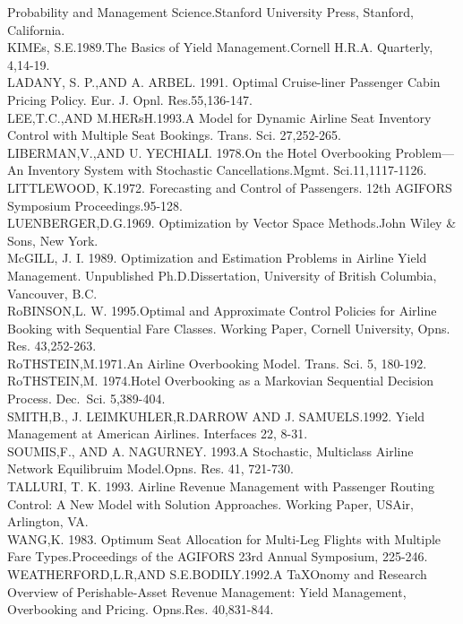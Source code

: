 Probability and Management Science.Stanford University Press, Stanford,
California.\\
KIMEs, S.E.1989.The Basics of Yield Management.Cornell H.R.A. Quarterly,
4,14-19.\\
LADANY, S. P.,AND A. ARBEL. 1991. Optimal Cruise-liner Passenger Cabin
Pricing Policy. Eur. J. Opnl. Res.55,136-147.\\
LEE,T.C.,AND M.HERsH.1993.A Model for Dynamic Airline Seat Inventory
Control with Multiple Seat Bookings. Trans. Sci. 27,252-265.\\
LIBERMAN,V.,AND U. YECHIALI. 1978.On the Hotel Overbooking Problem---An
Inventory System with Stochastic Cancellations.Mgmt. Sci.11,1117-1126.\\
LITTLEWOOD, K.1972. Forecasting and Control of Passengers. 12th AGIFORS
Symposium Proceedings.95-128.\\
LUENBERGER,D.G.1969. Optimization by Vector Space Methods.John Wiley \&
Sons, New York.\\
McGILL, J. I. 1989. Optimization and Estimation Problems in Airline
Yield Management. Unpublished Ph.D.Dissertation, University of British
Columbia, Vancouver, B.C.\\
RoBINSON,L. W. 1995.Optimal and Approximate Control Policies for Airline
Booking with Sequential Fare Classes. Working Paper, Cornell University,
Opns. Res. 43,252-263.\\
RoTHSTEIN,M.1971.An Airline Overbooking Model. Trans. Sci. 5, 180-192.\\
RoTHSTEIN,M. 1974.Hotel Overbooking as a Markovian Sequential Decision
Process. Dec.~Sci. 5,389-404.\\
SMITH,B., J. LEIMKUHLER,R.DARROW AND J. SAMUELS.1992. Yield Management
at American Airlines. Interfaces 22, 8-31.\\
SOUMIS,F., AND A. NAGURNEY. 1993.A Stochastic, Multiclass Airline
Network Equilibruim Model.Opns. Res. 41, 721-730.\\
TALLURI, T. K. 1993. Airline Revenue Management with Passenger Routing
Control: A New Model with Solution Approaches. Working Paper, USAir,
Arlington, VA.\\
WANG,K. 1983. Optimum Seat Allocation for Multi-Leg Flights with
Multiple Fare Types.Proceedings of the AGIFORS 23rd Annual Symposium,
225-246.\\
WEATHERFORD,L.R,AND S.E.BODILY.1992.A TaXOnomy and Research Overview of
Perishable-Asset Revenue Management: Yield Management, Overbooking and
Pricing. Opns.Res. 40,831-844.\\
